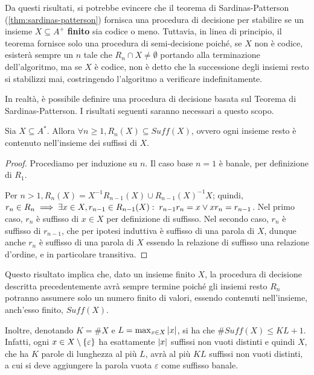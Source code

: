 Da questi risultati, si potrebbe evincere che il teorema di Sardinas-Patterson (\ref{thm:sardinas-patterson}) fornisca una procedura di decisione per stabilire se un insieme \(X \subseteq A^+\) \textbf{finito} sia codice o meno.
Tuttavia, in linea di principio, il teorema fornisce solo una procedura di semi-decisione poiché, se \(X\) non è codice, esisterà sempre un \(n\) tale che \(R_n \cap X \neq \emptyset\) portando alla terminazione dell'algoritmo, ma se \(X\) è codice, non è detto che la successione degli insiemi resto si stabilizzi mai, costringendo l'algoritmo a verificare indefinitamente.

In realtà, è possibile definire una procedura di decisione basata sul Teorema di Sardinas-Patterson.
I risultati seguenti saranno necessari a questo scopo.
\begin{proposition}[label=prop:rest_sets_subset_suffix]{}
  Sia \(X \subseteq A^*\). Allora \(\forall n \geq 1, R_n(X) \subseteq Suff(X)\), ovvero ogni insieme resto è contenuto nell'insieme dei suffissi di \(X\).
\end{proposition}
\begin{proof}
  Procediamo per induzione su \(n\).
  Il caso base \(n=1\) è banale, per definizione di \(R_1\).

  Per \(n>1, R_n(X)=X^{-1}R_{n-1}(X) \cup {R_{n-1}(X)}^{-1}X\); quindi, \(r_n \in R_n \implies \exists x \in X, r_{n-1}\in R_{n-1}(X) :\; r_{n-1}r_n = x \lor xr_n = r_{n-1}\).
  Nel primo caso, \(r_n\) è suffisso di \(x \in X\) per definizione di suffisso.
  Nel secondo caso, \(r_{n}\) è suffisso di \(r_{n-1}\), che per ipotesi induttiva è suffisso di una parola di \(X\), dunque anche \(r_n\) è suffisso di una parola di \(X\) essendo la relazione di suffisso una relazione d'ordine, e in particolare transitiva.
\end{proof}

Questo risultato implica che, dato un insieme finito \(X\), la procedura di decisione descritta precedentemente avrà sempre termine poiché gli insiemi resto \(R_n\) potranno assumere solo un numero finito di valori, essendo contenuti nell'insieme, anch'esso finito, \(Suff(X)\).

Inoltre, denotando \(K = \# X\) e \(L = \max_{x \in X} \left|x\right|\), si ha che \(\# Suff(X) \leq KL+1\).
Infatti, ogni \( x \in X \setminus \set{\varepsilon}\) ha esattamente \(\left|x\right|\) suffissi non vuoti distinti e quindi \(X\), che ha \(K\) parole di lunghezza al più \(L\), avrà al più \(KL\) suffissi non vuoti distinti, a cui si deve aggiungere la parola vuota \(\varepsilon\) come suffisso banale.

